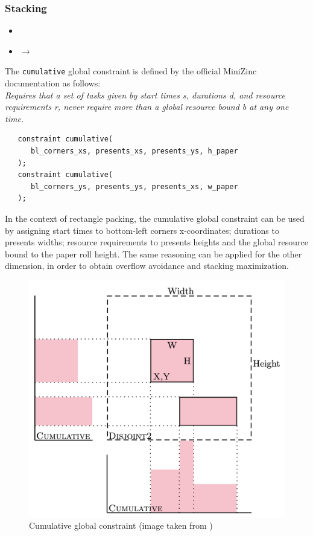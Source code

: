 \documentclass[a4paper,10pt]{article}
\newcounter{subsubsubsection}[subsubsection]
\begin{document}
\subsubsection{Stacking}
\begin{itemize}
   \item {}
   \item {} $\rightarrow$ 
\end{itemize}

 \label{sec:cumulative}
The \texttt{cumulative} global constraint is defined by the official MiniZinc documentation \cite{minizinc} as follows: \\
\emph{Requires that a set of tasks given by start times s, durations d, and resource requirements r, never require more than a global resource bound b at any one time.}

\begin{verbatim}
   constraint cumulative(
      bl_corners_xs, presents_xs, presents_ys, h_paper
   );
   constraint cumulative(
      bl_corners_ys, presents_ys, presents_xs, w_paper
   );
\end{verbatim}

In the context of rectangle packing, the cumulative global constraint can be used by assigning start times to bottom-left corners x-coordinates; durations to presents widths; resource requirements to presents heights and the global resource bound to the paper roll height.
The same reasoning can be applied for the other dimension, in order to obtain overflow avoidance and stacking maximization.

\begin{figure}[h]
   \centering
   \includegraphics[scale=0.2]{cumulative.png}
   \caption{Cumulative global constraint (image taken from \cite{cumulative})}
   \label{fig:cumulative}
\end{figure}
\end{document}
